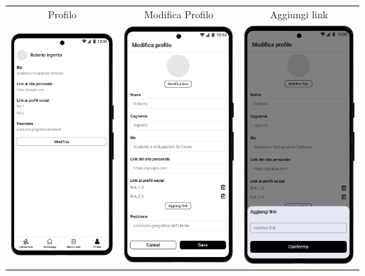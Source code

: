 \begin{center}
	\begin{tabular}{ccc}
		Profilo                                                                         &
		Modifica Profilo                                                                &
		Aggiungi link                                                                                   \\
		\includegraphics[width=.3\textwidth]{assets/mockup/Profile Page.png}            &
		\includegraphics[width=.3\textwidth]{assets/mockup/Profile Page - modifica.png} &
		\includegraphics[width=.3\textwidth]{assets/mockup/Profile Page - modifica - aggiungi link.png} \\
	\end{tabular}
\end{center}

